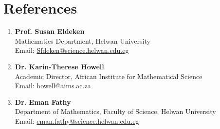 \documentclass[a4paper,11pt]{article}
\begin{document}
\section{\textbf{References}}
\vspace{0.2cm}
\small{
\begin{enumerate}[leftmargin=*,labelsep=2mm]
\item \textbf{Prof. Susan Eldeken}\\
   Mathematics Department, Helwan University\\
   Email: \href{Sfdeken@science.helwan.edu.eg}{Sfdeken@science.helwan.edu.eg}\\

\item \textbf{Dr. Karin-Therese Howell}\\
   Academic Director, African Institute for Mathematical Science\\
   Email: \href{howell@aims.ac.za}{howell@aims.ac.za}\\

\item \textbf{Dr. Eman Fathy}\\
   Department of Mathematics, Faculty of Science, Helwan University\\
   Email: \href{eman.fathy@science.helwan.edu.eg}{eman.fathy@science.helwan.edu.eg}\\
\end{enumerate}
}
\end{document}
